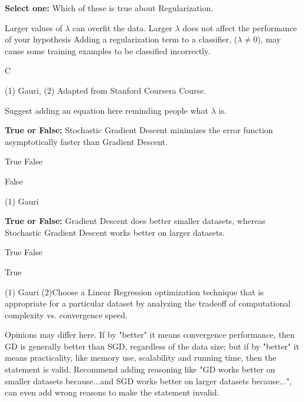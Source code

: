 \begin{questions}

    \question[1]\textbf{Select one:} Which of these is true about Regularization.
    \begin{checkboxes}
     \choice Larger values of $\lambda$ can overfit the data.
     \choice Larger $\lambda$ does not affect the performance of your hypothesis
     \choice Adding a regularization term to a classifier, ($\lambda \neq 0$), may cause some training examples to be classified incorrectly. 
    \end{checkboxes}
    \begin{soln}
   C
    \end{soln}
    \begin{qauthor}
    (1) Gauri, (2) Adapted from Stanford Coursera Course.
    \end{qauthor}
    
    \begin{qtester}
    Suggest adding an equation here reminding people what $\lambda$ is.
    \end{qtester}
    
    \question[1] \textbf{True or False:} Stochastic Gradient Descent minimizes the error function asymptotically faster than Gradient Descent.
    \begin{checkboxes}
     \choice True 
     \choice False
    \end{checkboxes}
    \begin{soln}
    False
    \end{soln}
    \begin{qauthor}
    (1) Gauri 
    \end{qauthor}
    
    \question[1] \textbf{True or False:} Gradient Descent does better smaller datasets, whereas Stochastic Gradient Descent works better on larger datasets.
    
    \begin{checkboxes}
     \choice True 
     \choice False
    \end{checkboxes}
    \begin{soln}
    True
    \end{soln}
    \begin{qauthor}
    (1) Gauri (2)Choose a Linear Regression optimization technique that is appropriate for a
particular dataset by analyzing the tradeoff of computational complexity vs.
convergence speed.
    \end{qauthor}
    
    \begin{qtester}
    Opinions may differ here. If by "better" it means convergence performance, then GD is generally better than SGD, regardless of the data size; but if by "better" it means practicality, like memory use, scalability and running time, then the statement is valid. Recommend adding reasoning like "GD works better on smaller datasets because...and SGD works better on larger datasets because...", can even add wrong reasons to make the statement invalid.
    \end{qtester}



\end{questions}
